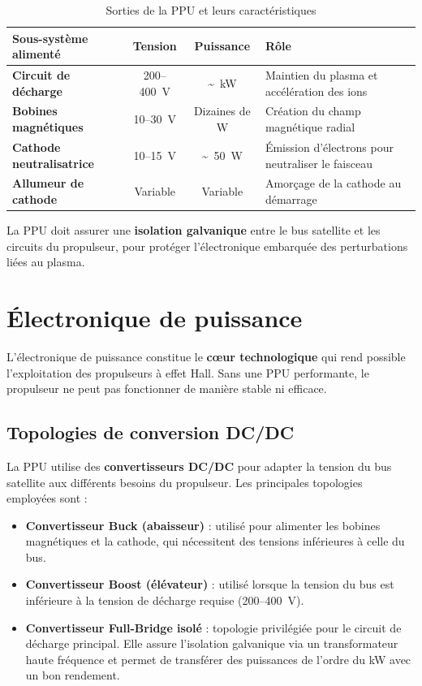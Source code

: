 \documentclass[12pt,a4paper]{article}
\begin{document}
\begin{table}[H]
\centering
\caption{Sorties de la PPU et leurs caractéristiques}
\begin{tabular}{>{\bfseries}l c c p{5cm}}
\toprule
Sous-système alimenté & Tension & Puissance & Rôle \\
\midrule
Circuit de décharge & 200--400~V & \textasciitilde~kW & Maintien du plasma et accélération des ions \\
Bobines magnétiques & 10--30~V & Dizaines de W & Création du champ magnétique radial \\
Cathode neutralisatrice & 10--15~V & \textasciitilde~50~W & Émission d'électrons pour neutraliser le faisceau \\
Allumeur de cathode & Variable & Variable & Amorçage de la cathode au démarrage \\
\bottomrule
\end{tabular}
\end{table}

La PPU doit assurer une \textbf{isolation galvanique} entre le bus satellite et les circuits du propulseur, pour protéger l'électronique embarquée des perturbations liées au plasma.

\section{Électronique de puissance}

L'électronique de puissance constitue le \textbf{cœur technologique} qui rend possible l'exploitation des propulseurs à effet Hall. Sans une PPU performante, le propulseur ne peut pas fonctionner de manière stable ni efficace.

\subsection{Topologies de conversion DC/DC}

La PPU utilise des \textbf{convertisseurs DC/DC} pour adapter la tension du bus satellite aux différents besoins du propulseur. Les principales topologies employées sont :

\begin{itemize}
    \item \textbf{Convertisseur Buck (abaisseur)} : utilisé pour alimenter les bobines magnétiques et la cathode, qui nécessitent des tensions inférieures à celle du bus.
    \item \textbf{Convertisseur Boost (élévateur)} : utilisé lorsque la tension du bus est inférieure à la tension de décharge requise (200--400~V).
    \item \textbf{Convertisseur Full-Bridge isolé} : topologie privilégiée pour le circuit de décharge principal. Elle assure l'isolation galvanique via un transformateur haute fréquence et permet de transférer des puissances de l'ordre du kW avec un bon rendement.
\end{itemize}
\end{document}
